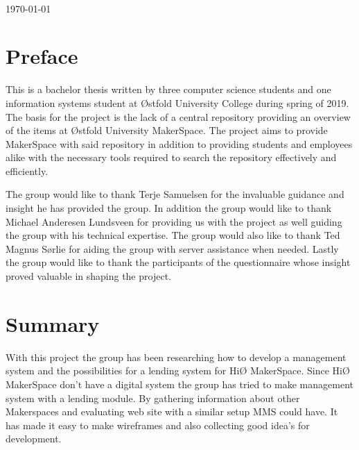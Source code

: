 \documentclass[12pt]{report}
\begin{document}
\begin{titlepage}
\begin{minipage}{0.8\textwidth}
\end{minipage}\\[2cm]



{\large \today}\\[2cm] %

\vfill %

\end{titlepage}

\makepresentationpage
{}


\chapter*{Preface}

This is a bachelor thesis written by three computer science students and one information systems student at Østfold University College during spring of 2019.
The basis for the project is the lack of a central repository providing an overview of the items at Østfold University MakerSpace.
The project aims to provide MakerSpace with said repository in addition to providing students and employees alike with the necessary tools required to search the repository effectively and efficiently.

The group would like to thank Terje Samuelsen for the invaluable guidance and insight he has provided the group.
In addition the group would like to thank Michael Anderesen Lundsveen for providing us with the project as well guiding the group with his technical expertise.
The group would also like to thank Ted Magnus Sørlie for aiding the group with server assistance when needed.
Lastly the group would like to thank the participants of the questionnaire whose insight proved valuable in shaping the project.

\chapter*{Summary}
With this project the group has been researching how to develop a management system and the possibilities for a lending system for HiØ MakerSpace. Since HiØ MakerSpace don't have a digital system the group has tried to make management system with a lending module. By gathering information about other Makerspaces and evaluating web site with a similar setup MMS could have. It has made it easy to make wireframes and also collecting good idea's for development. 
\end{document}
